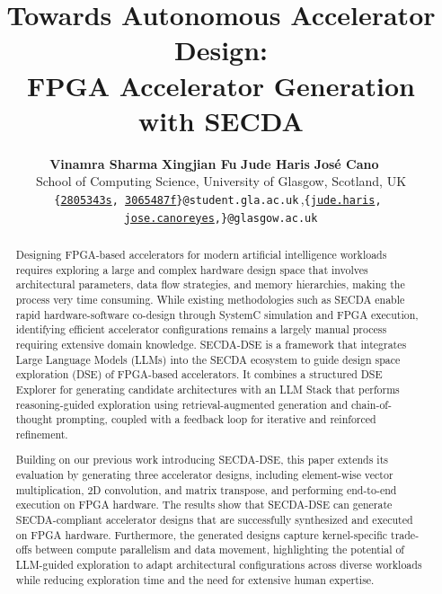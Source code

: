 \documentclass[conference]{IEEEtran}
\title{Towards Autonomous Accelerator Design: \\ FPGA Accelerator Generation with SECDA}
\author{%
\textbf{Vinamra Sharma}\quad
\textbf{Xingjian Fu}\quad
\textbf{Jude Haris}\quad
\textbf{Jos\'e Cano }$^{\quad}$\\
School of Computing Science, University of Glasgow, Scotland, UK\quad
\\
\footnotesize{\texttt{{\{\href{mailto:2805343s@student.gla.ac.uk}{2805343s},\,\href{mailto:3065487f@student.gla.ac.uk}{3065487f}\}@student.gla.ac.uk}}}\,,\footnotesize{\texttt{\{\href{mailto:Jude.Haris@glasgow.ac.uk}{jude.haris},\,\href{mailto:jose.canoreyes@glasgow.ac.uk}{jose.canoreyes},\}@glasgow.ac.uk}}
}
\begin{document}
\maketitle

\thispagestyle{firstpage} %
\pagestyle{plain}




\begin{abstract}

Designing FPGA-based accelerators for modern artificial intelligence workloads requires exploring a large and complex hardware design space that involves architectural parameters, data flow strategies, and memory hierarchies, making the process very time consuming. 
While existing methodologies such as SECDA enable rapid hardware-software co-design through SystemC simulation and FPGA execution, identifying efficient accelerator configurations remains a largely manual process requiring extensive domain knowledge. 
SECDA-DSE is a framework that integrates Large Language Models (LLMs) into the SECDA ecosystem to guide design space exploration (DSE) of FPGA-based accelerators. It combines a structured DSE Explorer for generating candidate architectures with an LLM Stack that performs reasoning-guided exploration using retrieval-augmented generation and chain-of-thought prompting, coupled with a feedback loop for iterative and reinforced refinement.

Building on our previous work introducing SECDA-DSE, this paper extends its evaluation by generating three accelerator designs, including element-wise vector multiplication, 2D convolution, and matrix transpose, and performing end-to-end execution on FPGA hardware.
The results show that SECDA-DSE can generate SECDA-compliant accelerator designs that are successfully synthesized and executed on FPGA hardware. Furthermore, the generated designs capture kernel-specific trade-offs between compute parallelism and data movement, highlighting the potential of LLM-guided exploration to adapt architectural configurations across diverse workloads while reducing exploration time and the need for extensive human expertise.

\end{abstract}







\end{document}
